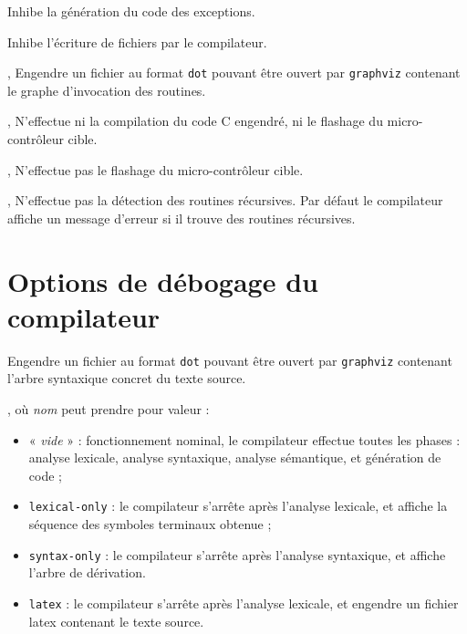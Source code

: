 
 Inhibe la génération du code des exceptions.



 Inhibe l'écriture de fichiers par le compilateur.


,  Engendre un fichier au format \texttt{dot} pouvant être ouvert par \texttt{graphviz} contenant le graphe d'invocation des routines.

,  N'effectue ni la compilation du code C engendré, ni le flashage du micro-contrôleur cible.


,  N'effectue pas le flashage du micro-contrôleur cible.


,  N'effectue pas la détection des routines récursives. Par défaut le compilateur affiche un message d'erreur si il trouve des routines récursives.






\section{Options de débogage du compilateur}


 Engendre un fichier au format \texttt{dot} pouvant être ouvert par \texttt{graphviz} contenant l'arbre syntaxique concret du texte source.


, où \emph{nom} peut prendre pour valeur :
\begin{itemize}
  \item « \emph{vide} » : fonctionnement nominal, le compilateur effectue toutes les phases : analyse lexicale, analyse syntaxique, analyse sémantique, et génération de code ;
  \item \texttt{lexical-only} : le compilateur s'arrête après l'analyse lexicale, et affiche la séquence des symboles terminaux obtenue ;
  \item \texttt{syntax-only} : le compilateur s'arrête après l'analyse syntaxique, et affiche l'arbre de dérivation.
  \item \texttt{latex} : le compilateur s'arrête après l'analyse lexicale, et engendre un fichier latex contenant le texte source.
\end{itemize}

